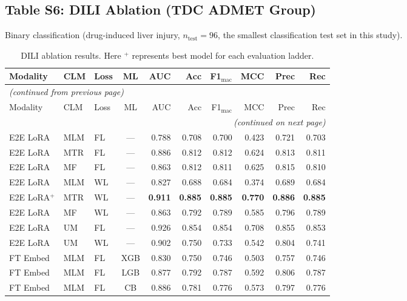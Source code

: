 \documentclass[9pt,a4paper]{article}
\begin{document}
\subsection*{Table S6: DILI Ablation (TDC ADMET Group)}

Binary classification (drug-induced liver injury, $n_\text{test}=96$, the smallest
classification test set in this study).

\begin{scriptsize}
\begin{longtable}{lllcrrrrrr}
\caption{DILI ablation results. Here $^{+}$ represents best model for each evaluation ladder.}
\label{tab:s6_dili} \\
\toprule
Modality & CLM & Loss & ML & AUC & Acc & F1$_\text{mac}$ & MCC & Prec & Rec \\
\midrule
\endfirsthead
\multicolumn{10}{l}{\footnotesize\textit{(continued from previous page)}} \\
\toprule
Modality & CLM & Loss & ML & AUC & Acc & F1$_\text{mac}$ & MCC & Prec & Rec \\
\midrule
\endhead
\midrule
\multicolumn{10}{r}{\footnotesize\textit{(continued on next page)}} \\
\endfoot
\bottomrule
\endlastfoot
E2E LoRA & MLM & FL & --- & 0.788 & 0.708 & 0.700 & 0.423 & 0.721 & 0.703 \\
E2E LoRA & MTR & FL & --- & 0.886 & 0.812 & 0.812 & 0.624 & 0.813 & 0.811 \\
E2E LoRA & MF  & FL & --- & 0.863 & 0.812 & 0.811 & 0.625 & 0.815 & 0.810 \\
E2E LoRA & MLM & WL & --- & 0.827 & 0.688 & 0.684 & 0.374 & 0.689 & 0.684 \\
E2E LoRA$^+$ & MTR & WL & --- & \textbf{0.911} & \textbf{0.885} & \textbf{0.885} & \textbf{0.770} & \textbf{0.886} & \textbf{0.885} \\
E2E LoRA & MF  & WL & --- & 0.863 & 0.792 & 0.789 & 0.585 & 0.796 & 0.789 \\
E2E LoRA & UM  & FL & --- & 0.926 & 0.854 & 0.854 & 0.708 & 0.855 & 0.853 \\
E2E LoRA & UM  & WL & --- & 0.902 & 0.750 & 0.733 & 0.542 & 0.804 & 0.741 \\
\midrule
FT Embed & MLM & FL & XGB & 0.830 & 0.750 & 0.746 & 0.503 & 0.757 & 0.746 \\
FT Embed & MLM & FL & LGB & 0.877 & 0.792 & 0.787 & 0.592 & 0.806 & 0.787 \\
FT Embed & MLM & FL & CB  & 0.886 & 0.781 & 0.776 & 0.573 & 0.797 & 0.776 \\

\end{longtable}
\end{scriptsize}
\end{document}
